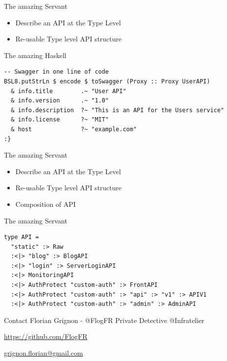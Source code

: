 \documentclass[10pt]{beamer}
\begin{document}
\begin{frame}{The amazing Servant}
\begin{itemize}
\item Describe an API at the Type Level
\item Re-usable Type level API structure
\end{itemize}
\end{frame}

\begin{frame}[fragile]{The amazing Haskell} 
\begin{verbatim}
-- Swagger in one line of code
BSL8.putStrLn $ encode $ toSwagger (Proxy :: Proxy UserAPI)
  & info.title        .~ "User API"
  & info.version      .~ "1.0"
  & info.description  ?~ "This is an API for the Users service"
  & info.license      ?~ "MIT"
  & host              ?~ "example.com"
:}
\end{verbatim}
\end{frame} 

\begin{frame}{The amazing Servant}
\begin{itemize}
\item Describe an API at the Type Level
\item Re-usable Type level API structure
\item Composition of API
\end{itemize}
\end{frame}

\begin{frame}[fragile]{The amazing Servant} 
\begin{verbatim}
type API =
  "static" :> Raw
  :<|> "blog" :> BlogAPI
  :<|> "login" :> ServerLoginAPI
  :<|> MonitoringAPI
  :<|> AuthProtect "custom-auth" :> FrontAPI
  :<|> AuthProtect "custom-auth" :> "api" :> "v1" :> APIV1
  :<|> AuthProtect "custom-auth" :> "admin" :> AdminAPI
\end{verbatim}
\end{frame} 

\begin{frame}{Contact}
  Florian Grignon - @FlogFR\newline
  Private Detective @Infratelier

  \begin{center}\url{https://github.com/FlogFR}\end{center}
  \begin{center}\url{grignon.florian@gmail.com}\end{center}
\end{frame}
\end{document}
